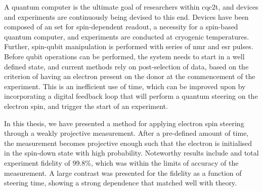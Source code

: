 A quantum computer is the ultimate goal of researchers within \gls{cqc2t}, and devices and experiments are continuously being devised to this end. Devices have been composed of an \gls{set} for spin-dependent readout, a necessity for a spin-based quantum computer, and experiments are conducted at cryogenic temperatures. Further, spin-qubit manipulation is performed with series of \gls{nmr} and \gls{esr} pulses. Before qubit operations can be performed, the system needs to start in a well defined state, and current methods rely on post-selection of data, based on the criterion of having an electron present on the donor at the commencement of the experiment. This is an inefficient use of time, which can be improved upon by incorporating a digital feedback loop that will perform a quantum steering on the electron spin, and trigger the start of an experiment.

In this thesis, we have presented a method for applying electron spin steering through a weakly projective measurement. After a pre-defined amount of time, the measurement becomes projective enough such that the electron is initialised in the spin-down state with high probability. Noteworthy results include and total experiment fidelity of 99.8\%, which was within the limits of accuracy of the measurement. A large contrast was presented for the fidelity as a function of steering time, showing a strong dependence that matched well with theory.

